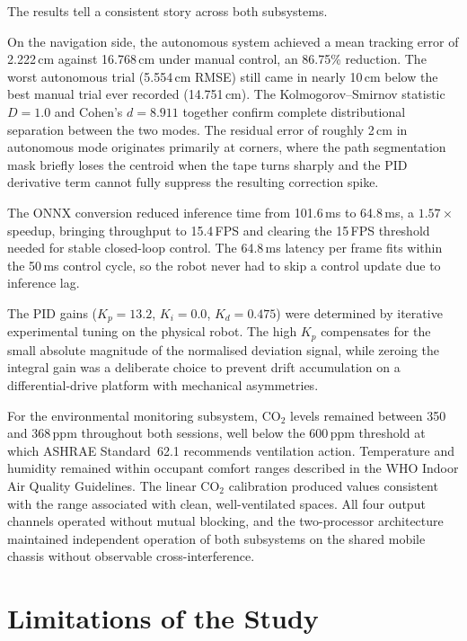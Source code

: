 The results tell a consistent story across both subsystems.

On the navigation side, the autonomous system achieved a mean tracking
error of 2.222\,cm against 16.768\,cm under manual control, an
86.75\% reduction. The worst autonomous trial (5.554\,cm RMSE) still
came in nearly 10\,cm below the best manual trial ever recorded
(14.751\,cm). The Kolmogorov--Smirnov statistic $D = 1.0$ and Cohen's
$d = 8.911$ together confirm complete distributional separation between
the two modes. The residual error of roughly 2\,cm in autonomous mode
originates primarily at corners, where the path segmentation mask
briefly loses the centroid when the tape turns sharply and the PID
derivative term cannot fully suppress the resulting correction spike.

The ONNX conversion reduced inference time from 101.6\,ms to 64.8\,ms,
a $1.57\times$ speedup, bringing throughput to 15.4\,FPS and clearing
the 15\,FPS threshold needed for stable closed-loop control. The
64.8\,ms latency per frame fits within the 50\,ms control cycle, so
the robot never had to skip a control update due to inference lag.

The PID gains ($K_p = 13.2$, $K_i = 0.0$, $K_d = 0.475$) were
determined by iterative experimental tuning on the physical robot.
The high $K_p$ compensates for the small absolute magnitude of the
normalised deviation signal, while zeroing the integral gain was a
deliberate choice to prevent drift accumulation on a
differential-drive platform with mechanical asymmetries.

For the environmental monitoring subsystem, CO$_2$ levels remained
between 350 and 368\,ppm throughout both sessions, well below the
600\,ppm threshold at which ASHRAE Standard~62.1 recommends ventilation
action. Temperature and humidity remained within occupant comfort
ranges described in the WHO Indoor Air Quality Guidelines. The linear
CO$_2$ calibration produced values consistent with the range associated
with clean, well-ventilated spaces. All four output channels operated
without mutual blocking, and the two-processor architecture maintained
independent operation of both subsystems on the shared mobile chassis
without observable cross-interference.

\section{Limitations of the Study}
\label{sec:lim}

